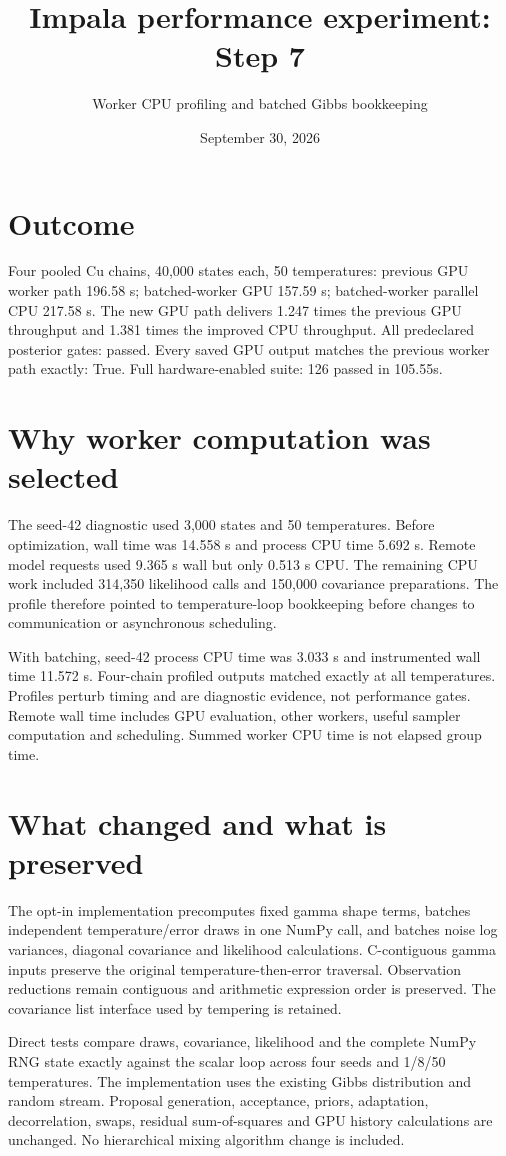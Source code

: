 \documentclass[11pt]{article}
\title{Impala performance experiment: Step 7}
\author{Worker CPU profiling and batched Gibbs bookkeeping}
\date{September 30, 2026}
\begin{document}
\maketitle
\section*{Outcome}
Four pooled Cu chains, 40,000 states each, 50 temperatures: previous GPU worker
path 196.58 s; batched-worker GPU 157.59 s; batched-worker parallel CPU 217.58 s.
The new GPU path delivers 1.247 times the previous GPU throughput and 1.381
times the improved CPU throughput. All predeclared posterior gates: passed.
Every saved GPU output matches the previous worker path exactly: True.
Full hardware-enabled suite: 126 passed in 105.55s.
\section*{Why worker computation was selected}
The seed-42 diagnostic used 3,000 states and 50 temperatures. Before optimization,
wall time was 14.558 s and process CPU time 5.692 s. Remote model requests
used 9.365 s wall but only 0.513 s CPU. The remaining CPU
work included 314,350 likelihood calls and 150,000 covariance preparations.
The profile therefore pointed to temperature-loop bookkeeping before changes
to communication or asynchronous scheduling.

With batching, seed-42 process CPU time was 3.033 s and instrumented wall
time 11.572 s. Four-chain profiled outputs matched exactly at all temperatures.
Profiles perturb timing and are diagnostic evidence, not performance gates.
Remote wall time includes GPU evaluation, other workers, useful sampler computation
and scheduling. Summed worker CPU time is not elapsed group time.
\section*{What changed and what is preserved}
The opt-in implementation precomputes fixed gamma shape terms, batches independent
temperature/error draws in one NumPy call, and batches noise log variances,
diagonal covariance and likelihood calculations. C-contiguous gamma inputs
preserve the original temperature-then-error traversal. Observation reductions
remain contiguous and arithmetic expression order is preserved. The covariance
list interface used by tempering is retained.

Direct tests compare draws, covariance, likelihood and the complete NumPy RNG
state exactly against the scalar loop across four seeds and 1/8/50 temperatures.
The implementation uses the existing Gibbs distribution and random stream.
Proposal generation, acceptance, priors, adaptation, decorrelation, swaps,
residual sum-of-squares and GPU history calculations are unchanged. No hierarchical
mixing algorithm change is included.
\end{document}
